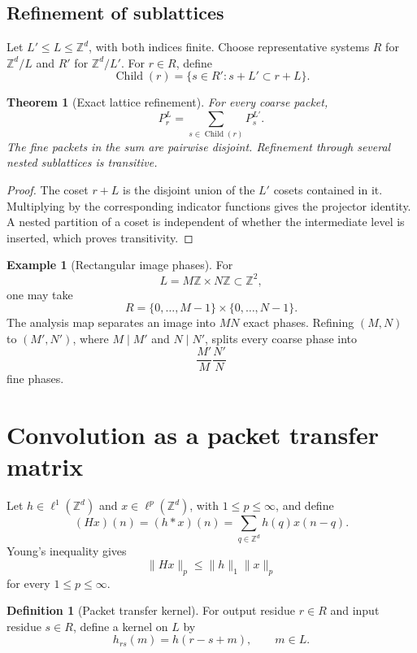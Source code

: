 \documentclass[11pt,letterpaper]{article}
\newtheorem{theorem}{Theorem}[section]
\theoremstyle{plain}
\theoremstyle{plain}
\theoremstyle{plain}
\theoremstyle{definition}
\newtheorem{definition}[definition]{Definition}
\theoremstyle{definition}
\newtheorem{example}[example]{Example}
\theoremstyle{definition}
\theoremstyle{definition}
\theoremstyle{remark}
\theoremstyle{remark}
\theoremstyle{remark}
\theoremstyle{remark}
\newcommand{\ZZ}{\mathbb Z}
\begin{document}
\subsection{Refinement of sublattices}

Let \(L'\leq L\leq\ZZ^d\), with both indices finite. Choose representative systems \(R\) for \(\ZZ^d/L\) and \(R'\) for \(\ZZ^d/L'\). For \(r\in R\), define
\[
\operatorname{Child}(r)
=
\{s\in R':s+L'\subset r+L\}.
\]

\begin{theorem}[Exact lattice refinement]\label{thm:lattice_refinement}
For every coarse packet,
\[
P_r^{L}
=
\sum_{s\in\operatorname{Child}(r)}P_s^{L'}.
\]
The fine packets in the sum are pairwise disjoint. Refinement through several nested sublattices is transitive.
\end{theorem}

\begin{proof}
The coset \(r+L\) is the disjoint union of the \(L'\) cosets contained in it. Multiplying by the corresponding indicator functions gives the projector identity. A nested partition of a coset is independent of whether the intermediate level is inserted, which proves transitivity.
\end{proof}

\begin{example}[Rectangular image phases]\label{ex:image_phases}
For
\[
L=M\ZZ\times N\ZZ\subset\ZZ^2,
\]
one may take
\[
R=\{0,\ldots,M-1\}\times\{0,\ldots,N-1\}.
\]
The analysis map separates an image into \(MN\) exact phases. Refining \((M,N)\) to \((M',N')\), where \(M\mid M'\) and \(N\mid N'\), splits every coarse phase into
\[
\frac{M'}M\frac{N'}N
\]
fine phases.
\end{example}

\section{Convolution as a packet transfer matrix}\label{extension:section:04}\label{sec:convolution}

Let \(h\in\ell^1(\ZZ^d)\) and \(x\in\ell^p(\ZZ^d)\), with \(1\leq p\leq\infty\), and define
\[
(Hx)(n)
=(h*x)(n)
=\sum_{q\in\ZZ^d}h(q)x(n-q).
\]
Young's inequality gives
\[
\|Hx\|_p\leq\|h\|_1\|x\|_p
\]
for every \(1\leq p\leq\infty\).

\begin{definition}[Packet transfer kernel]\label{def:packet_transfer_kernel}
For output residue \(r\in R\) and input residue \(s\in R\), define a kernel on \(L\) by
\[
h_{rs}(m)=h(r-s+m),
\qquad
m\in L.
\]
\end{definition}
\end{document}
